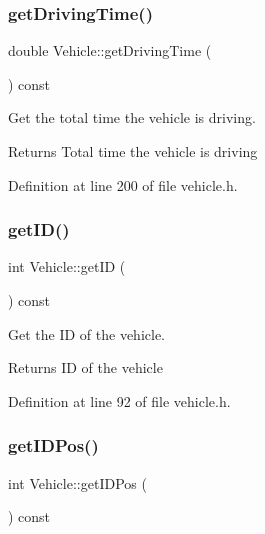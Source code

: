 \subsubsection{\texorpdfstring{get\+Driving\+Time()}{getDrivingTime()}}
{\footnotesize\ttfamily double Vehicle\+::get\+Driving\+Time (\begin{DoxyParamCaption}{ }\end{DoxyParamCaption}) const\hspace{0.3cm}{\ttfamily [inline]}}

Get the total time the vehicle is driving. \begin{DoxyReturn}{Returns}
Total time the vehicle is driving 
\end{DoxyReturn}


Definition at line 200 of file vehicle.\+h.

\mbox{\label{class_vehicle_acea04d455b93f807dabbe850799636c4}} 
\subsubsection{\texorpdfstring{get\+I\+D()}{getID()}}
{\footnotesize\ttfamily int Vehicle\+::get\+ID (\begin{DoxyParamCaption}{ }\end{DoxyParamCaption}) const\hspace{0.3cm}{\ttfamily [inline]}}

Get the ID of the vehicle. \begin{DoxyReturn}{Returns}
ID of the vehicle 
\end{DoxyReturn}


Definition at line 92 of file vehicle.\+h.

\mbox{\label{class_vehicle_a3c0ba62b556694de7519910ff7c222b0}} 
\subsubsection{\texorpdfstring{get\+I\+D\+Pos()}{getIDPos()}}
{\footnotesize\ttfamily int Vehicle\+::get\+I\+D\+Pos (\begin{DoxyParamCaption}{ }\end{DoxyParamCaption}) const\hspace{0.3cm}{\ttfamily [inline]}}


